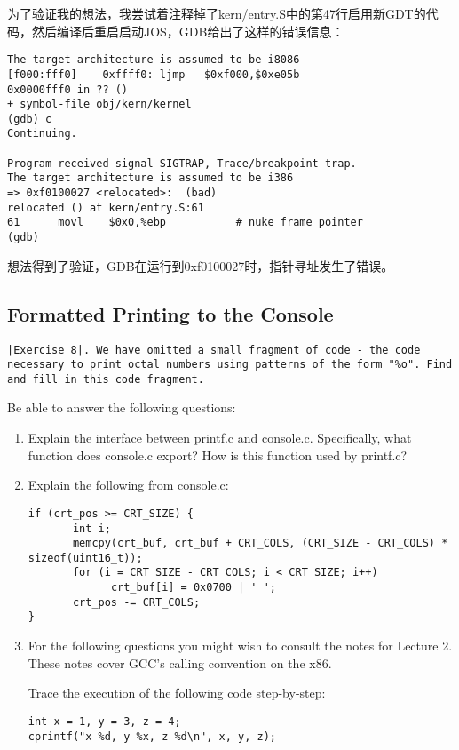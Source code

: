 \documentclass{article}
\begin{document}
\begin{CJK*}{UTF8}{gkai}
为了验证我的想法，我尝试着注释掉了kern/entry.S中的第47行启用新GDT的代码，然后编译后重启启动JOS，GDB给出了这样的错误信息：

\begin{lstlisting}[style=console]
The target architecture is assumed to be i8086
[f000:fff0]    0xffff0:	ljmp   $0xf000,$0xe05b
0x0000fff0 in ?? ()
+ symbol-file obj/kern/kernel
(gdb) c
Continuing.

Program received signal SIGTRAP, Trace/breakpoint trap.
The target architecture is assumed to be i386
=> 0xf0100027 <relocated>:	(bad)  
relocated () at kern/entry.S:61
61		movl	$0x0,%ebp			# nuke frame pointer
(gdb) 
\end{lstlisting}

想法得到了验证，GDB在运行到0xf0100027时，指针寻址发生了错误。

\subsection{Formatted Printing to the Console}

\begin{lstlisting}[style=exercise]
|Exercise 8|. We have omitted a small fragment of code - the code necessary to print octal numbers using patterns of the form "%o". Find and fill in this code fragment.
\end{lstlisting}

Be able to answer the following questions:

\begin{enumerate}
\item{Explain the interface between printf.c and console.c. Specifically, what function does console.c export? How is this function used by printf.c?}
\item{Explain the following from console.c:
{\scriptsize
\begin{verbatim}
if (crt_pos >= CRT_SIZE) {
       int i;
       memcpy(crt_buf, crt_buf + CRT_COLS, (CRT_SIZE - CRT_COLS) * sizeof(uint16_t));
       for (i = CRT_SIZE - CRT_COLS; i < CRT_SIZE; i++)
             crt_buf[i] = 0x0700 | ' ';
       crt_pos -= CRT_COLS;
}
\end{verbatim}}
}
\item{For the following questions you might wish to consult the notes for Lecture 2. These notes cover GCC's calling convention on the x86.

Trace the execution of the following code step-by-step:
{\scriptsize
\begin{verbatim}
int x = 1, y = 3, z = 4;
cprintf("x %d, y %x, z %d\n", x, y, z);
\end{verbatim}}

}
\end{enumerate}
\end{CJK*}
\end{document}
